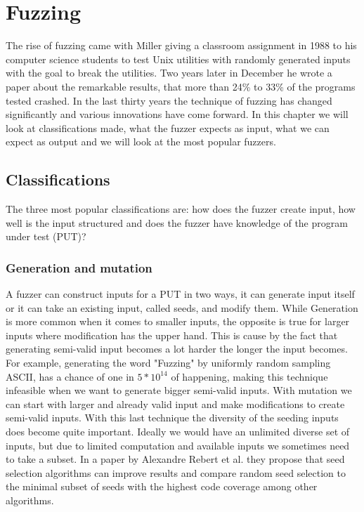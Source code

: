 \chapter{Fuzzing}
\label{cha:2:fuzzing}
\label{cha:2:intro}
The rise of fuzzing came with Miller giving a classroom assignment\cite{21FuzzingAssignment} in 1988 to his computer science students to test Unix utilities with randomly generated inputs with the goal to break the utilities. Two years later in December he wrote a paper\cite{4originalFuzzingUnixUtils} about the remarkable results, that more than 24\% to 33\% of the programs tested crashed.
In the last thirty years the technique of fuzzing has changed significantly and various innovations have come forward. In this chapter we will look at classifications made, what the fuzzer expects as input, what we can expect as output and we will look at the most popular fuzzers.

\section{Classifications}
\label{cha:2:Classifications}
The three most popular classifications are\cite{12Fuzzingasurvey}\cite{13manes2019survey}\cite{30FuzzingHackartandscience}: how does the fuzzer create input, how well is the input structured and does the fuzzer have knowledge of the program under test (PUT)?

\subsection{Generation and mutation}
\label{cha:2:generationMutation}
A fuzzer can construct inputs for a PUT in two ways, it can generate input itself or it can take an existing input, called seeds, and modify them. While Generation is more common when it comes to smaller inputs, the opposite is true for larger inputs where modification has the upper hand. This is cause by the fact that generating semi-valid input becomes a lot harder the longer the input becomes. For example, generating the word "Fuzzing" by uniformly random sampling ASCII, has a chance of one in $5*10^{14}$ of happening, making this technique infeasible when we want to generate bigger semi-valid inputs. With mutation we can start with larger and already valid input and make modifications to create semi-valid inputs. With this last technique the diversity of the seeding inputs does become quite important. Ideally we would have an unlimited diverse set of inputs, but due to limited computation and available inputs we sometimes need to take a subset. In a paper by Alexandre Rebert et al. \cite{14rebert2014seedselecting} they propose that seed selection algorithms can improve results and compare random seed selection to the minimal subset of seeds with the highest code coverage among other algorithms. 

